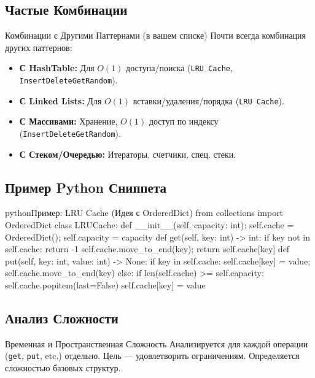 \subsection{Частые Комбинации}
\begin{myblock}{Комбинации с Другими Паттернами (в вашем списке)}
    Почти всегда комбинация других паттернов:
    \begin{itemize}[nosep, leftmargin=*]
        \item \textbf{С HashTable:} Для $O(1)$ доступа/поиска (\texttt{LRU Cache}, \texttt{InsertDeleteGetRandom}).
        \item \textbf{С Linked Lists:} Для $O(1)$ вставки/удаления/порядка (\texttt{LRU Cache}).
        \item \textbf{С Массивами:} Хранение, $O(1)$ доступ по индексу (\texttt{InsertDeleteGetRandom}).
        \item \textbf{С Стеком/Очередью:} Итераторы, счетчики, спец. стеки.
    \end{itemize}
\end{myblock}

\subsection{Пример Python Сниппета}
\begin{codebox}{python}{Пример: LRU Cache (Идея с OrderedDict)}
from collections import OrderedDict
class LRUCache:
    def __init__(self, capacity: int):
        self.cache = OrderedDict(); self.capacity = capacity
    def get(self, key: int) -> int:
        if key not in self.cache: return -1
        self.cache.move_to_end(key); return self.cache[key]
    def put(self, key: int, value: int) -> None:
        if key in self.cache:
            self.cache[key] = value; self.cache.move_to_end(key)
        else:
            if len(self.cache) >= self.capacity:
                self.cache.popitem(last=False)
            self.cache[key] = value
\end{codebox}

\subsection{Анализ Сложности}
\begin{myblock}{Временная и Пространственная Сложность}
    Анализируется для каждой операции (\texttt{get}, \texttt{put}, etc.) отдельно. Цель — удовлетворить ограничениям. Определяется сложностью базовых структур.
\end{myblock}

